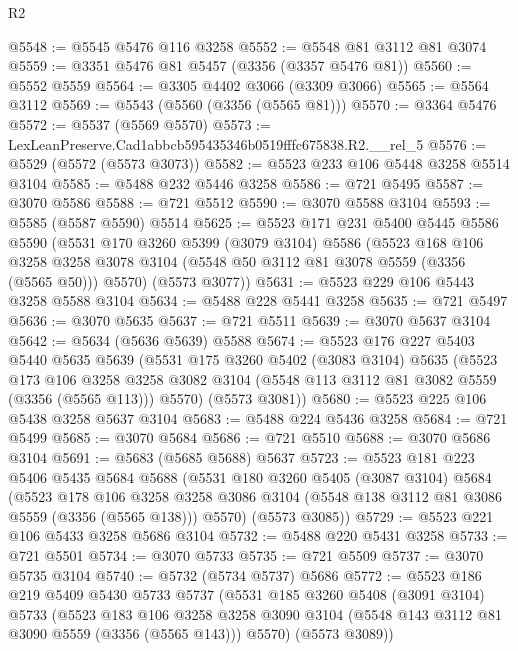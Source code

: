 \begin{lexlean}{R2}
\begin{coremodule}
@5548 := @5545 @5476 @116 @3258
@5552 := @5548 @81 @3112 @81 @3074
@5559 := @3351 @5476 @81 @5457 (@3356 (@3357 @5476 @81))
@5560 := @5552 @5559
@5564 := @3305 @4402 @3066 (@3309 @3066)
@5565 := @5564 @3112
@5569 := @5543 (@5560 (@3356 (@5565 @81)))
@5570 := @3364 @5476
@5572 := @5537 (@5569 @5570)
@5573 := LexLeanPreserve.Cad1abbcb595435346b0519fffc675838.R2.__rel_5
@5576 := @5529 (@5572 (@5573 @3073))
@5582 := @5523 @233 @106 @5448 @3258 @5514 @3104
@5585 := @5488 @232 @5446 @3258
@5586 := @721 @5495
@5587 := @3070 @5586
@5588 := @721 @5512
@5590 := @3070 @5588 @3104
@5593 := @5585 (@5587 @5590) @5514
@5625 := @5523
    @171
    @231
    @5400
    @5445
    @5586
    @5590
    (@5531
      @170
      @3260
      @5399
      (@3079 @3104)
      @5586
      (@5523
        @168
        @106
        @3258
        @3258
        @3078
        @3104
        (@5548 @50 @3112 @81 @3078 @5559 (@3356 (@5565 @50)))
        @5570)
      (@5573 @3077))
@5631 := @5523 @229 @106 @5443 @3258 @5588 @3104
@5634 := @5488 @228 @5441 @3258
@5635 := @721 @5497
@5636 := @3070 @5635
@5637 := @721 @5511
@5639 := @3070 @5637 @3104
@5642 := @5634 (@5636 @5639) @5588
@5674 := @5523
    @176
    @227
    @5403
    @5440
    @5635
    @5639
    (@5531
      @175
      @3260
      @5402
      (@3083 @3104)
      @5635
      (@5523
        @173
        @106
        @3258
        @3258
        @3082
        @3104
        (@5548 @113 @3112 @81 @3082 @5559 (@3356 (@5565 @113)))
        @5570)
      (@5573 @3081))
@5680 := @5523 @225 @106 @5438 @3258 @5637 @3104
@5683 := @5488 @224 @5436 @3258
@5684 := @721 @5499
@5685 := @3070 @5684
@5686 := @721 @5510
@5688 := @3070 @5686 @3104
@5691 := @5683 (@5685 @5688) @5637
@5723 := @5523
    @181
    @223
    @5406
    @5435
    @5684
    @5688
    (@5531
      @180
      @3260
      @5405
      (@3087 @3104)
      @5684
      (@5523
        @178
        @106
        @3258
        @3258
        @3086
        @3104
        (@5548 @138 @3112 @81 @3086 @5559 (@3356 (@5565 @138)))
        @5570)
      (@5573 @3085))
@5729 := @5523 @221 @106 @5433 @3258 @5686 @3104
@5732 := @5488 @220 @5431 @3258
@5733 := @721 @5501
@5734 := @3070 @5733
@5735 := @721 @5509
@5737 := @3070 @5735 @3104
@5740 := @5732 (@5734 @5737) @5686
@5772 := @5523
    @186
    @219
    @5409
    @5430
    @5733
    @5737
    (@5531
      @185
      @3260
      @5408
      (@3091 @3104)
      @5733
      (@5523
        @183
        @106
        @3258
        @3258
        @3090
        @3104
        (@5548 @143 @3112 @81 @3090 @5559 (@3356 (@5565 @143)))
        @5570)
      (@5573 @3089))

\end{coremodule}
\end{lexlean}
